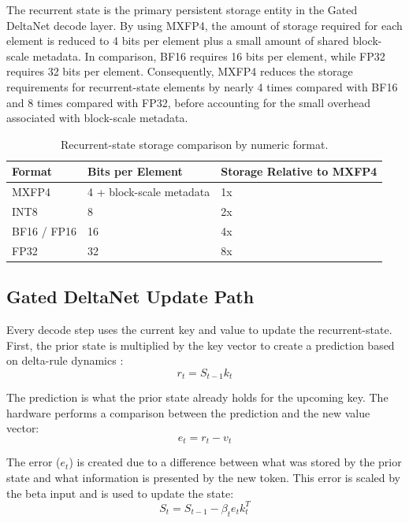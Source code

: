 ﻿\documentclass[conference]{IEEEtran}
\begin{document}
The recurrent state is the primary persistent storage entity in the Gated DeltaNet decode layer. By using MXFP4, the amount of storage required for each element is reduced to 4 bits per element plus a small amount of shared block-scale metadata. In comparison, BF16 requires 16 bits per element, while FP32 requires 32 bits per element. Consequently, MXFP4 reduces the storage requirements for recurrent-state elements by nearly 4 times compared with BF16 and 8 times compared with FP32, before accounting for the small overhead associated with block-scale metadata.

\begin{table}[t]
\centering
\caption{Recurrent-state storage comparison by numeric format.}
\label{tab:memory_footprint}
\begin{tabular}{lll}
\hline
Format & Bits per Element & Storage Relative to MXFP4 \\
\hline
MXFP4 & 4 + block-scale metadata & 1x \\
INT8 & 8 & 2x \\
BF16 / FP16 & 16 & 4x \\
FP32 & 32 & 8x \\
\hline
\end{tabular}
\end{table}

\subsection{Gated DeltaNet Update Path}
Every decode step uses the current key and value to update the recurrent-state. First, the prior state is multiplied by the key vector to create a prediction based on delta-rule dynamics \cite{b3}:
\begin{equation}
r_t = S_{t-1} k_t
\end{equation}

The prediction is what the prior state already holds for the upcoming key. The hardware performs a comparison between the prediction and the new value vector:
\begin{equation}
e_t = r_t - v_t
\end{equation}

The error ($e_t$) is created due to a difference between what was stored by the prior state and what information is presented by the new token. This error is scaled by the beta input and is used to update the state:
\begin{equation}
S_t = S_{t-1} - \beta_t e_t k_t^T
\end{equation}
\end{document}
